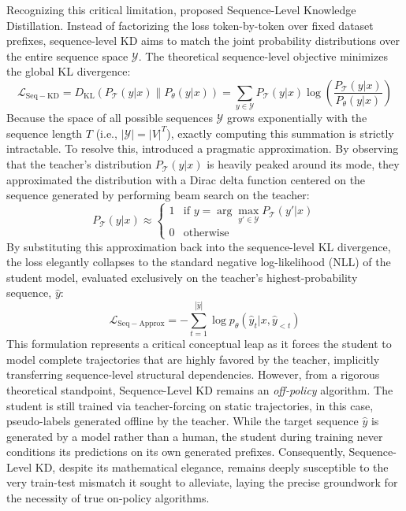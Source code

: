 \documentclass{article} %
\newcommand{\KL}{D_{\mathrm{KL}}}
\newcommand{\ptheta}{p_\theta}
\newcommand{\loss}{\mathcal{L}}
\begin{document}
Recognizing this critical limitation, \citet{kim2016sequence} proposed Sequence-Level Knowledge Distillation. Instead of factorizing the loss token-by-token over fixed dataset prefixes, sequence-level KD aims to match the joint probability distributions over the entire sequence space $\mathcal{Y}$. The theoretical sequence-level objective minimizes the global KL divergence:
\begin{equation}
    \loss_{\mathrm{Seq-KD}} = \KL(P_{\mathcal{T}}(y | x) \parallel P_{\theta}(y | x)) = \sum_{y \in \mathcal{Y}} P_{\mathcal{T}}(y | x) \log \left( \frac{P_{\mathcal{T}}(y | x)}{P_{\theta}(y | x)} \right)
\end{equation}
Because the space of all possible sequences $\mathcal{Y}$ grows exponentially with the sequence length $T$ (i.e., $|\mathcal{Y}| = |V|^T$), exactly computing this summation is strictly intractable. To resolve this, \citet{kim2016sequence} introduced a pragmatic approximation. By observing that the teacher's distribution $P_{\mathcal{T}}(y|x)$ is heavily peaked around its mode, they approximated the distribution with a Dirac delta function centered on the sequence generated by performing beam search on the teacher:
\begin{equation}
    P_{\mathcal{T}}(y | x) \approx \begin{cases} 
      1 & \text{if } y = \arg\max_{y' \in \mathcal{Y}} P_{\mathcal{T}}(y' | x) \\
      0 & \text{otherwise} 
   \end{cases}
\end{equation}
By substituting this approximation back into the sequence-level KL divergence, the loss elegantly collapses to the standard negative log-likelihood (NLL) of the student model, evaluated exclusively on the teacher's highest-probability sequence, $\hat{y}$:
\begin{equation}
    \loss_{\mathrm{Seq-Approx}} = - \sum_{t=1}^{|\hat{y}|} \log \ptheta(\hat{y}_t | x, \hat{y}_{<t})
\end{equation}
This formulation represents a critical conceptual leap as it forces the student to model complete trajectories that are highly favored by the teacher, implicitly transferring sequence-level structural dependencies. However, from a rigorous theoretical standpoint, Sequence-Level KD remains an \textit{off-policy} algorithm. The student is still trained via teacher-forcing on static trajectories, in this case, pseudo-labels generated offline by the teacher. While the target sequence $\hat{y}$ is generated by a model rather than a human, the student during training never conditions its predictions on its own generated prefixes. Consequently, Sequence-Level KD, despite its mathematical elegance, remains deeply susceptible to the very train-test mismatch it sought to alleviate, laying the precise groundwork for the necessity of true on-policy algorithms.
\end{document}
